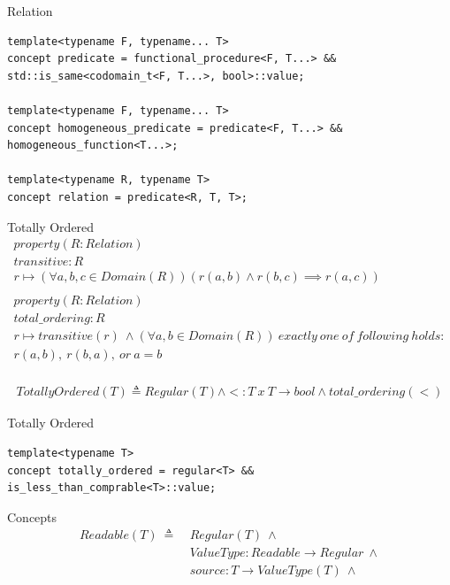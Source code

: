 \documentclass[10pt]{beamer}
\begin{document}
\begin{frame}[fragile]{Relation}
\begin{lstlisting}[style=cpp]
template<typename F, typename... T>
concept predicate = functional_procedure<F, T...> && std::is_same<codomain_t<F, T...>, bool>::value;

template<typename F, typename... T>
concept homogeneous_predicate = predicate<F, T...> && homogeneous_function<T...>;

template<typename R, typename T>
concept relation = predicate<R, T, T>;
\end{lstlisting}
\end{frame}


\begin{frame}{Totally Ordered}
    \begin{align*}
        property(R: Relation)\\
        transitive: R \\
                r \mapsto (\forall a,b,c \in Domain(R)) (r(a, b) \land r(b,c) \implies r(a, c))\\\\
        property(R: Relation)\\
        total\_ordering: R \\
                r \mapsto transitive(r)~\land(\forall a,b \in Domain(R))~exactly~one~of~following~holds:\\
            r(a, b),~r(b, a),~or~a = b\\
    \end{align*}

    \begin{align*}
        TotallyOrdered(T) \triangleq Regular(T) \land <: T~x~T \rightarrow bool \land total\_ordering(<)
    \end{align*}
\end{frame}

\begin{frame}[fragile]{Totally Ordered}
\begin{lstlisting}[style=cpp]
template<typename T>
concept totally_ordered = regular<T> && is_less_than_comprable<T>::value;

\end{lstlisting}
\end{frame}



\begin{frame}{Concepts}
    \begin{align*}
        Readable(T) ~\triangleq~ & Regular(T) ~\land \\
        & ValueType: Readable \rightarrow Regular ~\land \\
        & source: T \rightarrow ValueType(T) ~\land\\
    \end{align*}
\end{frame}
\end{document}
